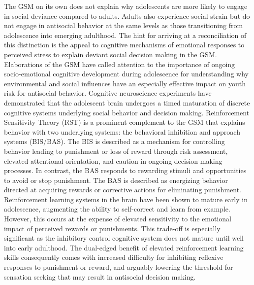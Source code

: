 \documentclass[utf8]{article}
\begin{document}
The GSM on its own does not explain why adolescents are more likely to engage in social deviance compared to adults. Adults also experience social strain but do not engage in antisocial behavior at the same levels as those transitioning from adolescence into emerging adulthood. The hint for arriving at a reconciliation of this distinction is the appeal to cognitive mechanisms of emotional responses to perceived stress to explain deviant social decision making in the GSM. Elaborations of the GSM have called attention to the importance of ongoing socio-emotional cognitive development during adolescence for understanding why environmental and social influences have an especially effective impact on youth risk for antisocial behavior. Cognitive neuroscience experiments have demonstrated that the adolescent brain undergoes a timed maturation of discrete cognitive systems underlying social behavior and decision making. Reinforcement Sensitivity Theory (RST) is a prominent complement to the GSM that explains behavior with two underlying systems: the behavioral inhibition and approach systems (BIS/BAS). The BIS is described as a mechanism for controlling behavior leading to punishment or loss of reward through risk assessment, elevated attentional orientation, and caution in ongoing decision making processes. In contrast, the BAS responds to rewarding stimuli and opportunities to avoid or stop punishment. The BAS is described as energizing behavior directed at acquiring rewards or corrective actions for eliminating punishment. Reinforcement learning systems in the brain have been shown to mature early in adolescence, augmenting the ability to self-correct and learn from example. However, this occurs at the expense of elevated sensitivity to the emotional impact of perceived rewards or punishments. This trade-off is especially significant as the inhibitory control cognitive system does not mature until well into early adulthood. The dual-edged benefit of elevated reinforcement learning skills consequently comes with increased difficulty for inhibiting reflexive responses to punishment or reward, and arguably lowering the threshold for sensation seeking that may result in antisocial decision making. 
\end{document}
